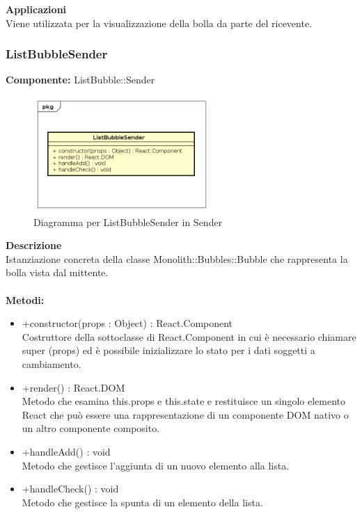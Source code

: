 \textbf{Applicazioni}\\
Viene utilizzata per la visualizzazione della bolla da parte del ricevente. 


\clearpage

\subsubsection{ListBubbleSender}
\textbf{Componente:}  ListBubble::Sender\\
   \FloatBarrier
   \begin{figure}[ht]
   \centering
   \includegraphics[width=0.6\textwidth]{img/single-ListBubbleSender}
   \caption{{Diagramma per ListBubbleSender in Sender}}
\end{figure}
\FloatBarrier
\textbf{Descrizione}\\
Istanziazione concreta della classe Monolith::Bubbles::Bubble che rappresenta la bolla vista dal mittente.
\\
\\
\textbf{Metodi:} 
\begin{itemize}
\item +constructor(props : Object) : React.Component 
\\
Costruttore della sottoclasse di React.Component in cui è necessario chiamare super (props) ed è possibile inizializzare lo stato per i dati soggetti a cambiamento.

\item +render() : React.DOM 
\\
Metodo che esamina this.props e this.state e restituisce un singolo elemento React che può essere una rappresentazione di un componente DOM nativo o un altro componente composito.

\item +handleAdd() : void 
\\
Metodo che gestisce l'aggiunta di un nuovo elemento alla lista.
\item +handleCheck() : void 
\\
Metodo che gestisce la spunta di un elemento della lista.
\end{itemize} 


